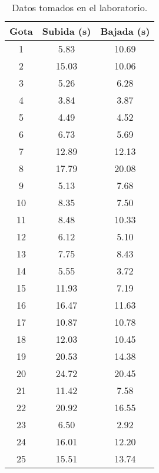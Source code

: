 \documentclass{article}
\begin{document}
\begin{enumerate}
\begin{table}[h!]
    \centering
    \begin{tabular}{|c|c|c|}
    \hline
      Gota   & Subida (s) & Bajada (s)\\
      \hline
        1    &  5.83 & 10.69\\
        \hline
        2    &  15.03 & 10.06\\
        \hline
        3    &  5.26 & 6.28\\
        \hline
        4    &  3.84 & 3.87\\
        \hline
        5    &  4.49 & 4.52\\
        \hline
        6    &  6.73 & 5.69\\
        \hline
        7    &  12.89 & 12.13\\
        \hline
        8    &  17.79 & 20.08\\
        \hline
        9    &  5.13 & 7.68\\
        \hline
        10    &  8.35 & 7.50\\
        \hline
        11    &  8.48 & 10.33\\
        \hline
        12    &  6.12 & 5.10\\
        \hline
        13    &  7.75 & 8.43\\
        \hline
        14    &  5.55 & 3.72\\
        \hline
        15    &  11.93 & 7.19\\
        \hline
        16    &  16.47 & 11.63\\
        \hline
        17    &  10.87 & 10.78\\
        \hline
        18    &  12.03 & 10.45\\
        \hline
        19    &  20.53 & 14.38\\
        \hline
        20    &  24.72 & 20.45\\
        \hline
        21    &  11.42 & 7.58\\
        \hline
        22    &  20.92 & 16.55\\
        \hline
        23    &  6.50 & 2.92\\
        \hline
        24    &  16.01 & 12.20\\
        \hline
        25    &  15.51 & 13.74\\
        \hline
        
    \end{tabular}
    \caption{Datos tomados en el laboratorio.}
    \label{tab:my_label}
\end{table}



\end{enumerate}
\end{document}
